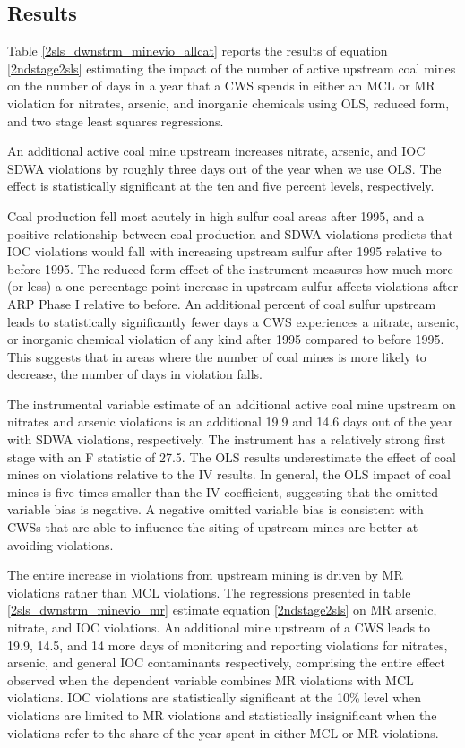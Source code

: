 \documentclass{article}
\begin{document}
\subsection{Results}

Table \ref{2sls_dwnstrm_minevio_allcat} reports the results of equation \ref{2ndstage2sls} estimating the impact of the number of active upstream coal mines on the number of days in a year that a CWS spends in either an MCL or MR violation for nitrates, arsenic, and inorganic chemicals using OLS, reduced form, and two stage least squares regressions. 

An additional active coal mine upstream increases nitrate, arsenic, and IOC SDWA violations by roughly three days out of the year when we use OLS. The effect is statistically significant at the ten and five percent levels, respectively.

Coal production fell most acutely in high sulfur coal areas after 1995, and a positive relationship between coal production and SDWA violations predicts that IOC violations would fall with increasing upstream sulfur after 1995 relative to before 1995. The reduced form effect of the instrument measures how much more (or less) a one-percentage-point increase in upstream sulfur affects violations after ARP Phase I relative to before. An additional percent of coal sulfur upstream leads to statistically significantly fewer days a CWS experiences a nitrate, arsenic, or inorganic chemical violation of any kind after 1995 compared to before 1995. This suggests that in areas where the number of coal mines is more likely to decrease, the number of days in violation falls.

The instrumental variable estimate of an additional active coal mine upstream on nitrates and arsenic violations is an additional 19.9 and 14.6 days out of the year with SDWA violations, respectively. The instrument has a relatively strong first stage with an F statistic of 27.5. The OLS results underestimate the effect of coal mines on violations relative to the IV results. In general, the OLS impact of coal mines is five times smaller than the IV coefficient, suggesting that the omitted variable bias is negative. A negative omitted variable bias is consistent with CWSs that are able to influence the siting of upstream mines are better at avoiding violations. 

The entire increase in violations from upstream mining is driven by MR violations rather than MCL violations. The regressions presented in table \ref{2sls_dwnstrm_minevio_mr} estimate equation \ref{2ndstage2sls} on MR arsenic, nitrate, and IOC violations. An additional mine upstream of a CWS leads to 19.9, 14.5, and 14 more days of monitoring and reporting violations for nitrates, arsenic, and general IOC contaminants respectively, comprising the entire effect observed when the dependent variable combines MR violations with MCL violations. IOC violations are statistically significant at the 10\% level when violations are limited to MR violations and statistically insignificant when the violations refer to the share of the year spent in either MCL or MR violations.
\end{document}
